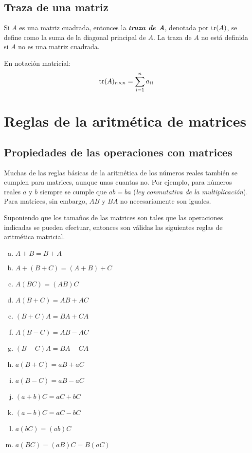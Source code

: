 \documentclass[a4paper,12pt]{article}
\begin{document}
\subsection{Traza de una matriz}

\begin{concept}[i]
  Si $A$ es una matriz cuadrada, entonces la \textbf{\emph{traza de A}},
  denotada por $\operatorname{tr} (A)$, se define como la suma de la diagonal principal de
  $A$. La traza de $A$ no está definida si $A$ no es una matriz cuadrada.
\end{concept}
En notación matricial:
\begin{align*}
  \operatorname{tr} (A)_{n\times n}=\sum_{i=1}^n a_{ii}
\end{align*}

\section{Reglas de la aritmética de matrices}

\subsection{Propiedades de las operaciones con matrices}

Muchas de las reglas básicas de la aritmética de los números reales también se
cumplen para matrices, aunque unas cuantas no. Por ejemplo, para números
reales $a$ y $b$ siempre se cumple que $ab=ba$ (\emph{ley conmutativa de la
multiplicación}). Para matrices, sin embargo, $AB$ y $BA$ no necesariamente
son iguales.
\begin{theorem}
  Suponiendo que los tamaños de las matrices son tales que las operaciones
  indicadas se pueden efectuar, entonces son válidas las siguientes reglas de
  aritmética matricial.

  \begin{enumerate}[(a)]
    \item $A+B=B+A$ \hfill {}
    \item $A+(B+C)=(A+B)+C$ \hfill {}
    \item $A(BC)=(AB)C$ \hfill {}
    \item $A(B+C)=AB+AC$ \hfill {}
    \item $(B+C)A=BA+CA$ \hfill {}
    \item $A(B-C)=AB-AC$
    \item $(B-C)A=BA-CA$
    \item $a(B+C)=aB+aC$
    \item $a(B-C)=aB-aC$
    \item $(a+b)C=aC+bC$
    \item $(a-b)C=aC-bC$
    \item $a(bC)=(ab)C$
    \item $a(BC)=(aB)C=B(aC)$
  \end{enumerate}
  \label{theo:aritmat}
\end{theorem}
\end{document}
